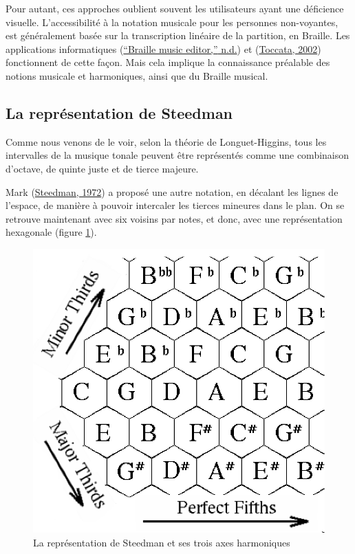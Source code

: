 \documentclass[
]{book}
\begin{document}
Pour autant, ces approches oublient souvent les utilisateurs ayant une
déficience visuelle. L'accessibilité à la notation musicale pour les
personnes non-voyantes, est généralement basée sur la transcription linéaire
de la partition, en Braille. Les applications informatiques
(\protect\hyperlink{ref-BrailleMusicEditor}{{``Braille music editor,''} n.d.}) et (\href{047-bibliographie.html\#Toccata}{Toccata, 2002})
fonctionnent de cette façon. Mais
cela implique la connaissance préalable des notions musicale et harmoniques,
ainsi que du Braille musical.

\hypertarget{la-repruxe9sentation-de-steedman}{%
\subsection{La représentation de Steedman}\label{la-repruxe9sentation-de-steedman}}

Comme nous venons de le voir, selon la théorie de Longuet-Higgins, tous
les intervalles de la musique tonale peuvent être représentés comme une
combinaison d'octave, de quinte juste et de tierce majeure.

Mark (\protect\hyperlink{ref-steedman1972formal}{Steedman, 1972}) a proposé une
autre notation, en décalant les lignes de l'espace, de manière à pouvoir
intercaler les tierces mineures dans le plan. On se retrouve maintenant avec
six voisins par notes, et donc, avec une représentation hexagonale
(figure \ref{fig:steedman}).

\begin{figure}
\centering
\includegraphics{img/Steedman.png}
\caption{\label{fig:steedman}La représentation de Steedman et ses
trois axes harmoniques}
\end{figure}
\end{document}
